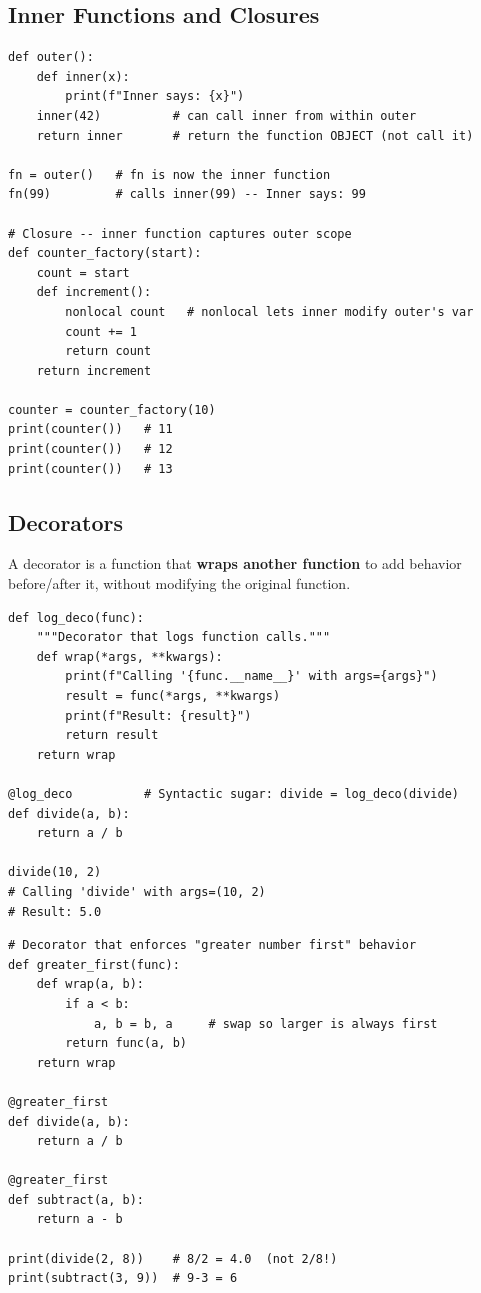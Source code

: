 \documentclass[12pt,a4paper]{article}
\begin{document}
\subsection{Inner Functions and Closures}

\begin{lstlisting}
def outer():
    def inner(x):
        print(f"Inner says: {x}")
    inner(42)          # can call inner from within outer
    return inner       # return the function OBJECT (not call it)

fn = outer()   # fn is now the inner function
fn(99)         # calls inner(99) -- Inner says: 99

# Closure -- inner function captures outer scope
def counter_factory(start):
    count = start
    def increment():
        nonlocal count   # nonlocal lets inner modify outer's var
        count += 1
        return count
    return increment

counter = counter_factory(10)
print(counter())   # 11
print(counter())   # 12
print(counter())   # 13
\end{lstlisting}

\subsection{Decorators}

A decorator is a function that \textbf{wraps another function} to add behavior before/after it, without modifying the original function.

\begin{lstlisting}
def log_deco(func):
    """Decorator that logs function calls."""
    def wrap(*args, **kwargs):
        print(f"Calling '{func.__name__}' with args={args}")
        result = func(*args, **kwargs)
        print(f"Result: {result}")
        return result
    return wrap

@log_deco          # Syntactic sugar: divide = log_deco(divide)
def divide(a, b):
    return a / b

divide(10, 2)
# Calling 'divide' with args=(10, 2)
# Result: 5.0
\end{lstlisting}

\begin{lstlisting}
# Decorator that enforces "greater number first" behavior
def greater_first(func):
    def wrap(a, b):
        if a < b:
            a, b = b, a     # swap so larger is always first
        return func(a, b)
    return wrap

@greater_first
def divide(a, b):
    return a / b

@greater_first
def subtract(a, b):
    return a - b

print(divide(2, 8))    # 8/2 = 4.0  (not 2/8!)
print(subtract(3, 9))  # 9-3 = 6
\end{lstlisting}
\end{document}
